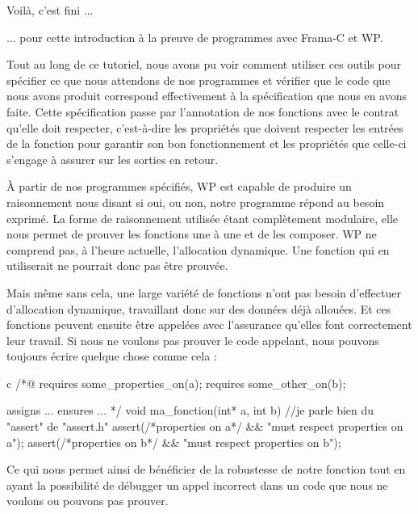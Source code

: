 \begin{Quotation}
Voilà, c'est fini ...
\end{Quotation}



... pour cette introduction à la preuve de programmes avec Frama-C et WP.



Tout au long de ce tutoriel, nous avons pu voir comment utiliser ces outils
pour spécifier ce que nous attendons de nos programmes et vérifier que le code que
nous avons produit correspond effectivement à la spécification que nous en 
avons faite. Cette spécification passe par l'annotation de nos fonctions avec 
le contrat qu'elle doit respecter, c'est-à-dire les propriétés que doivent
respecter les entrées de la fonction pour garantir son bon fonctionnement et 
les propriétés que celle-ci s'engage à assurer sur les sorties en retour.



À partir de nos programmes spécifiés, WP est capable de produire un 
raisonnement nous disant si oui, ou non, notre programme répond au besoin 
exprimé. La forme de raisonnement utilisée étant complètement modulaire, elle 
nous permet de prouver les fonctions une à une et de les composer. WP ne 
comprend pas, à l'heure actuelle, l'allocation dynamique. Une fonction qui en 
utiliserait ne pourrait donc pas être prouvée.



Mais même sans cela, une large variété de fonctions n'ont pas besoin 
d'effectuer d'allocation dynamique, travaillant donc sur des données déjà 
allouées. Et ces fonctions peuvent ensuite être appelées avec l'assurance 
qu'elles font correctement leur travail. Si nous ne voulons pas prouver le 
code appelant, nous pouvons toujours écrire quelque chose comme cela :



\begin{CodeBlock}{c}
/*@
  requires some_properties_on(a);
  requires some_other_on(b);

  assigns ...
  ensures ...
*/
void ma_fonction(int* a, int b){
  //je parle bien du "assert" de "assert.h"
  assert(/*properties on a*/ && "must respect properties on a");  
  assert(/*properties on b*/ && "must respect properties on b");
}
\end{CodeBlock}



Ce qui nous permet ainsi de bénéficier de la robustesse de notre fonction tout en
ayant la possibilité de débugger un appel incorrect dans un code que nous ne 
voulons ou pouvons pas prouver.



